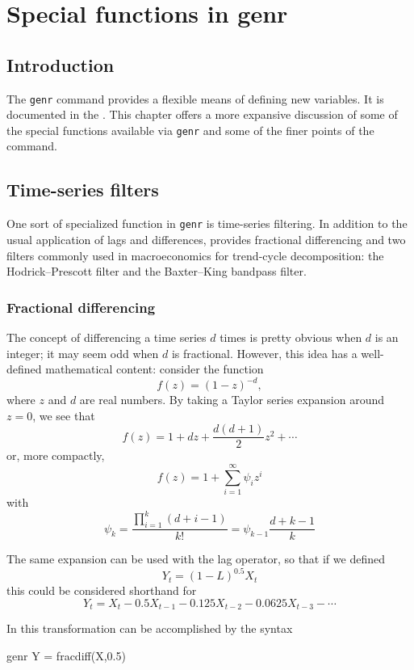 \chapter{Special functions in genr}
\label{chap-genr}

\section{Introduction}
\label{genr-intro}

The \verb+genr+ command provides a flexible means of defining new
variables.  It is documented in the \GCR.  This chapter offers a more
expansive discussion of some of the special functions available via
\verb+genr+ and some of the finer points of the command.
    
\section{Time-series filters}
\label{sec:filters}

One sort of specialized function in \verb+genr+ is time-series
filtering. In addition to the usual application of lags and
differences,  provides fractional differencing and two
filters commonly used in macroeconomics for trend-cycle decomposition:
the Hodrick--Prescott filter and the Baxter--King bandpass filter.

\subsection{Fractional differencing}
\label{sec:fracdiff}

The concept of differencing a time series $d$ times is pretty obvious
when $d$ is an integer; it may seem odd when $d$ is
fractional. However, this idea has a well-defined
mathematical content: consider the function
\[
  f(z) = (1 - z)^{-d},
\]
where $z$ and $d$ are real numbers. By taking a Taylor series
expansion around $z=0$, we see that
\[
  f(z) = 1 + dz + \frac{d (d+1)}{2} z^2 + \cdots 
\]
or, more compactly,
\[
  f(z) = 1 + \sum_{i=1}^{\infty} \psi_i z^i
\]
with
\[
  \psi_k = \frac{\prod_{i=1}^{k} (d+i-1) }{k!} = \psi_{k-1} \frac{d+k-1}{k}
\]

The same expansion can be used with the lag operator, so that if we defined
\[
  Y_t = (1-L)^{0.5} X_t
\]
this could be considered shorthand for
\[
Y_t = X_t - 0.5 X_{t-1} - 0.125 X_{t-2} - 0.0625 X_{t-3} - \cdots 
\]
    
In  this transformation can be accomplished by the syntax 
\begin{code}
  genr Y = fracdiff(X,0.5)
\end{code}

